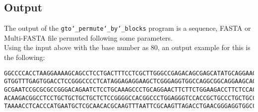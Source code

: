 \subsection*{Output}
The output of the \texttt{gto\char`_permute\char`_by\char`_blocks} program is a sequence, FASTA or Multi-FASTA file permuted following some parameters.\\
Using the input above with the base number as 80, an output example for this is the following:
\begin{lstlisting}
GGCCCCACCTAAGGAAAAGCAGCCTCCTGACTTTCCTCGCTTGGGCCGAGACAGCGAGCATATGCAGGAAGCGGCAGGAA
GTGGTTTGAGTGGACCTCCGGGCCCCTCATAGGAGAGGAAGCTCGGGAGGTGGCCAGGCGGCAGGAAGCAGGCCAGTGCC
GCGAATCCGCGCGCCGGGACAGAATCTCCTGCAAAGCCCTGCAGGAACTTCTTCTGGAAGACCTTCTCCACCCCCCCAGC
ACAAGACGGCCTCCTGCTGCTGCTGCTCTCCGGGGCCACGGCCCTGGAGGGTCCACCGCTGCCCTGCTGCCATTGTCCCC
TAAAACCTCACCCATGAATGCTCGCAACACGCAAGTTTAATTCGCAAGTTAGACCTGAACGGGAGGTGGCCACGCAAGTT
\end{lstlisting}